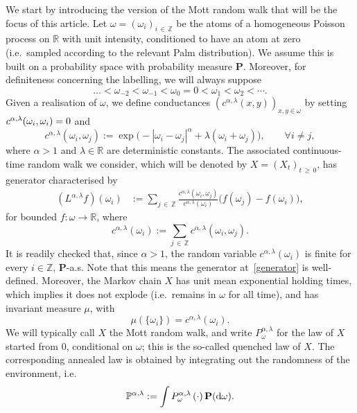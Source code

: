 \documentclass[AHL,Unicode,longabstracts,published]{cedram}
\newcommand{\Z}{\mathbb Z}
\newcommand{\R}{\mathbb R}
\renewcommand{\P}{\mathbb P}
\newcommand{\bfP}{\mathbf{P}}
\newcommand{\dd}{\text{\upshape{d}}}
\let\oldforall\forall
\renewcommand*{\forall}{\mathrel{\oldforall}}
\begin{document}
We start by introducing the version of the Mott random walk that will be the focus of this article. Let $\omega=(\omega_i)_{i\,\in\,\Z}$ be the atoms of a homogeneous Poisson process on $\R$ with unit intensity, conditioned to have an atom at zero (i.e.\ sampled according to the relevant Palm distribution). We assume this is built on a probability space with probability measure $\bfP$. Moreover, for definiteness concerning the labelling, we will always suppose
\[
\dots <\omega_{-2}< \omega_{-1}<\omega_0=0<\omega_1<\omega_2<\cdots.
\]
Given a realisation of $\omega$, we define conductances $(c^{\alpha,\lambda}(x,y))_{x,y\in \omega}$ by setting $c^{\alpha,\lambda}(\omega_i,\omega_i)\\=0$ and
\begin{equation}\label{cdef}
c^{\alpha,\lambda}(\omega_i,\omega_j):=\exp\big(-|\omega_i-\omega_j|^\alpha+\lambda(\omega_i+\omega_j)\big),\qquad \forall i\neq j,
\end{equation}
where $\alpha>1$ and $\lambda\in\R$ are deterministic constants. The associated continuous-time random walk we consider, which will be denoted by $X=(X_t)_{t\,\geq\,0}$, has generator characterised by
\begin{align}\label{generator}
\left(L^{\alpha,\lambda}f\right)(\omega_i)&:=\sum_{j\,\in\,\Z}\frac{c^{\alpha,\lambda}(\omega_i,\omega_j)}{c^{\alpha,\lambda}(\omega_i)}\big(f(\omega_j)-f(\omega_i)\big),
\end{align}
for bounded $f:\omega\rightarrow\R$, where
\[
c^{\alpha,\lambda}(\omega_i):=\sum_{j\,\in\,\Z}c^{\alpha,\lambda}(\omega_i,\omega_j).
\]
It is readily checked that, since $\alpha>1$, the random variable $c^{\alpha,\lambda}(\omega_i)$ is finite for every $i\in \Z$, $\bfP$-a.s. Note that this means the generator at~\eqref{generator} is well-defined. Moreover, the Markov chain $X$ has unit mean exponential holding times, which implies it does not explode (i.e.\ remains in $\omega$ for all time), and has invariant measure $\mu$, with
\begin{equation}\label{eq:def_invariant}
\mu(\{\omega_i\})=c^{\alpha,\lambda}(\omega_i).
\end{equation}
We will typically call $X$ the Mott random walk, and write $P^{\alpha,\lambda}_\omega$ for the law of $X$ started from $0$, conditional on $\omega$; this is the so-called quenched law of $X$. The corresponding annealed law is obtained by integrating out the randomness of the environment, i.e.\
\[
\P^{\alpha,\lambda}:=\int P^{\alpha,\lambda}_\omega\left(\cdot\right)\bfP(\dd\omega).
\]
\end{document}
